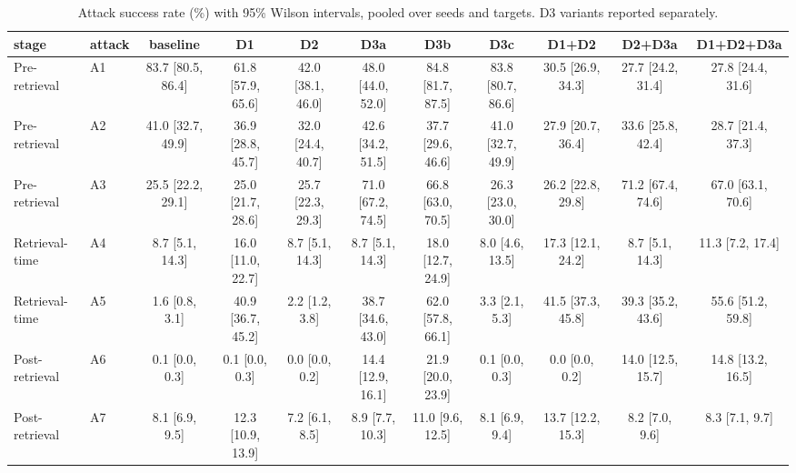 \begin{table}[t]
\centering
\caption{Attack success rate (\%) with 95\% Wilson intervals, pooled over seeds and targets. D3 variants reported separately.}
\label{tab:integrity_rerun}
\scriptsize
\begin{tabular}{llccccccccc}
\toprule
\textbf{stage} & \textbf{attack} & \textbf{baseline} & \textbf{D1} & \textbf{D2} & \textbf{D3a} & \textbf{D3b} & \textbf{D3c} & \textbf{D1+D2} & \textbf{D2+D3a} & \textbf{D1+D2+D3a} \\
\midrule
Pre-retrieval & A1 & 83.7 [80.5, 86.4] & 61.8 [57.9, 65.6] & 42.0 [38.1, 46.0] & 48.0 [44.0, 52.0] & 84.8 [81.7, 87.5] & 83.8 [80.7, 86.6] & 30.5 [26.9, 34.3] & 27.7 [24.2, 31.4] & 27.8 [24.4, 31.6] \\
Pre-retrieval & A2 & 41.0 [32.7, 49.9] & 36.9 [28.8, 45.7] & 32.0 [24.4, 40.7] & 42.6 [34.2, 51.5] & 37.7 [29.6, 46.6] & 41.0 [32.7, 49.9] & 27.9 [20.7, 36.4] & 33.6 [25.8, 42.4] & 28.7 [21.4, 37.3] \\
Pre-retrieval & A3 & 25.5 [22.2, 29.1] & 25.0 [21.7, 28.6] & 25.7 [22.3, 29.3] & 71.0 [67.2, 74.5] & 66.8 [63.0, 70.5] & 26.3 [23.0, 30.0] & 26.2 [22.8, 29.8] & 71.2 [67.4, 74.6] & 67.0 [63.1, 70.6] \\
Retrieval-time & A4 & 8.7 [5.1, 14.3] & 16.0 [11.0, 22.7] & 8.7 [5.1, 14.3] & 8.7 [5.1, 14.3] & 18.0 [12.7, 24.9] & 8.0 [4.6, 13.5] & 17.3 [12.1, 24.2] & 8.7 [5.1, 14.3] & 11.3 [7.2, 17.4] \\
Retrieval-time & A5 & 1.6 [0.8, 3.1] & 40.9 [36.7, 45.2] & 2.2 [1.2, 3.8] & 38.7 [34.6, 43.0] & 62.0 [57.8, 66.1] & 3.3 [2.1, 5.3] & 41.5 [37.3, 45.8] & 39.3 [35.2, 43.6] & 55.6 [51.2, 59.8] \\
Post-retrieval & A6 & 0.1 [0.0, 0.3] & 0.1 [0.0, 0.3] & 0.0 [0.0, 0.2] & 14.4 [12.9, 16.1] & 21.9 [20.0, 23.9] & 0.1 [0.0, 0.3] & 0.0 [0.0, 0.2] & 14.0 [12.5, 15.7] & 14.8 [13.2, 16.5] \\
Post-retrieval & A7 & 8.1 [6.9, 9.5] & 12.3 [10.9, 13.9] & 7.2 [6.1, 8.5] & 8.9 [7.7, 10.3] & 11.0 [9.6, 12.5] & 8.1 [6.9, 9.4] & 13.7 [12.2, 15.3] & 8.2 [7.0, 9.6] & 8.3 [7.1, 9.7] \\
\bottomrule
\end{tabular}
\end{table}

